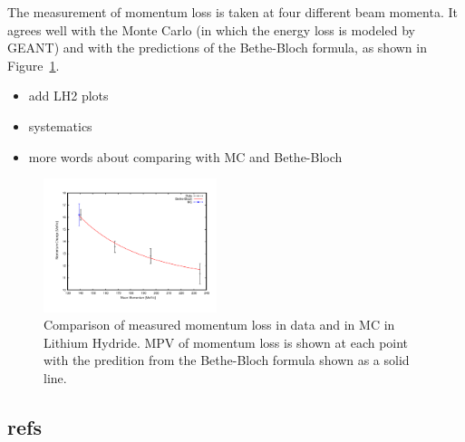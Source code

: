 The measurement of momentum loss is taken at four different beam momenta.  It agrees well with the Monte Carlo (in which the energy loss is modeled by GEANT) and with the predictions of the Bethe-Bloch formula, as shown in Figure~\ref{fig:eloss_bb}.

{\color{red}
\begin{itemize}
\item add LH2 plots
\item systematics
\item more words about comparing with MC and Bethe-Bloch
\end{itemize}
}

\begin{figure}
\hfil\includegraphics[width=0.45\textwidth]{11-Absorber/Figures/bb_compare.pdf}\hfil

\caption{\label{fig:eloss_bb} Comparison of measured momentum loss in data and in MC in Lithium Hydride.  MPV of momentum loss is shown at each point with the predition from the Bethe-Bloch formula shown as a solid line.}
\end{figure}





\subsection{refs}
